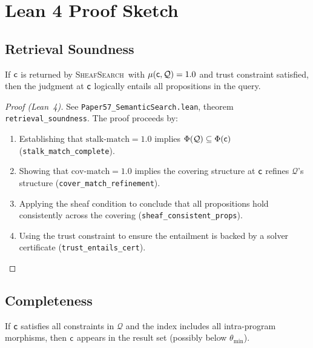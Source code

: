 \documentclass[11pt]{article}
\newcommand{\QuerySheaf}{\mathcal{Q}}
\newcommand{\MatchScore}{\mu}
\newcommand{\CoverMatch}{\mathrm{cov\text{-}match}}
\newcommand{\StalknMatch}{\mathrm{stalk\text{-}match}}
\newcommand{\CodeSearch}{\textsc{SheafSearch}}
\newcommand{\props}{\Phi}                           %
\begin{document}
\section{Lean 4 Proof Sketch}\label{sec:soundness}

\subsection{Retrieval Soundness}

\begin{theorem}\label{thm:retrieval-sound}
If $\mathsf{c}$ is returned by \CodeSearch\ with $\MatchScore(\coord,
\QuerySheaf) = 1.0$ and trust constraint satisfied, then the judgment
at $\mathsf{c}$ logically entails all propositions in the query.
\end{theorem}

\begin{proof}[Proof (Lean~4)]
See \texttt{Paper57\_SemanticSearch.lean}, theorem
\texttt{retrieval\_soundness}.  The proof proceeds by:
\begin{enumerate}[noitemsep]
  \item Establishing that $\StalknMatch = 1.0$ implies
        $\props(\QuerySheaf) \subseteq \props(\coord)$
        (\texttt{stalk\_match\_complete}).
  \item Showing that $\CoverMatch = 1.0$ implies the covering
        structure at $\mathsf{c}$ refines $\QuerySheaf$'s structure
        (\texttt{cover\_match\_refinement}).
  \item Applying the sheaf condition to conclude that all propositions
        hold consistently across the covering
        (\texttt{sheaf\_consistent\_props}).
  \item Using the trust constraint to ensure the entailment is backed
        by a solver certificate (\texttt{trust\_entails\_cert}).
\end{enumerate}
\end{proof}

\subsection{Completeness}

\begin{theorem}\label{thm:completeness}
If $\mathsf{c}$ satisfies all constraints in $\QuerySheaf$ and the index
includes all intra-program morphisms, then $\mathsf{c}$ appears in the
result set (possibly below $\theta_{\min}$).
\end{theorem}
\end{document}
